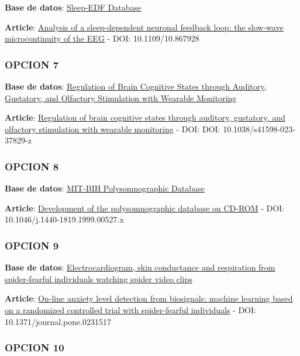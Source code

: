 \documentclass[10pt]{article}
\begin{document}
\textbf{Base de datos}: \href{https://physionet.org/content/sleep-edfx/1.0.0/}{Sleep-EDF Database}

\textbf{Article}: \href{https://ieeexplore.ieee.org/document/867928}{Analysis of a sleep-dependent neuronal feedback loop: the slow-wave microcontinuity of the EEG} - DOI: 10.1109/10.867928

\subsubsection*{OPCION 7}

\textbf{Base de datos}: \href{https://physionet.org/content/brain-wearable-monitoring/1.0.0/}{Regulation of Brain Cognitive States through Auditory, Gustatory, and Olfactory Stimulation with Wearable Monitoring}

\textbf{Article}: \href{https://www.nature.com/articles/s41598-023-37829-z#Sec3}{Regulation of brain cognitive states through auditory, gustatory, and olfactory stimulation with wearable monitoring} - DOI: DOI: 10.1038/s41598-023-37829-z

\subsubsection*{OPCION 8}

\textbf{Base de datos}: \href{https://physionet.org/content/slpdb/1.0.0/}{MIT-BIH Polysomnographic Database}

\textbf{Article}: \href{https://pubmed.ncbi.nlm.nih.gov/10459681/}{Development of the polysomnographic database on CD-ROM} - DOI: 10.1046/j.1440-1819.1999.00527.x

\subsubsection*{OPCION 9}

\textbf{Base de datos}: \href{https://physionet.org/content/ecg-spider-clip/1.0.0/}{Electrocardiogram, skin conductance and respiration from spider-fearful individuals watching spider video clips}

\textbf{Article}: \href{https://journals.plos.org/plosone/article?id=10.1371/journal.pone.0231517}{On-line anxiety level detection from biosignals: machine learning based on a randomized controlled trial with spider-fearful individuals} - DOI: 10.1371/journal.pone.0231517

\subsubsection*{OPCION 10}
\end{document}
